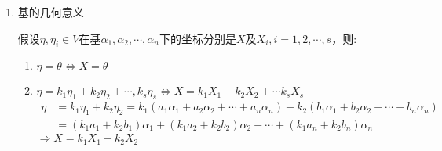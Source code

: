\begin{property}[线性空间的性质]
\begin{enumerate}
        \item 基的几何意义
        \begin{theorem}
            假设$\eta, \eta_i \in V$在基$\alpha_1, \alpha_2, \cdots, \alpha_n$下的坐标分别是$X$及$X_i, i = 1, 2, \cdots, s$，则:
            \begin{enumerate}
                \item $\eta = \theta  \Leftrightarrow X = \theta$
                \item $\eta = k_1\eta_1 + k_2\eta_2 + \cdots, k_s\eta_s \Leftrightarrow X = k_1X_1 + k_2X_2 + \cdots k_sX_s$
                \begin{equation}
                    \begin{aligned}
                        \eta &= k_1\eta_1 + k_2\eta_2 = k_1(a_1\alpha_1 + a_2\alpha_2 + \cdots + a_n\alpha_n) + k_2(b_1\alpha_1 + b_2\alpha_2 + \cdots + b_n\alpha_n)\\
                        &=(k_1a_1 + k_2b_1)\alpha_1 + (k_1a_2 + k_2b_2)\alpha_2 + \cdots + (k_1a_n + k_2b_n)\alpha_n
                    \end{aligned}
                \end{equation}
                $\Rightarrow X = k_1X_1 + k_2X_2$
            \end{enumerate}
        \end{theorem}
    \end{enumerate}

\end{property}